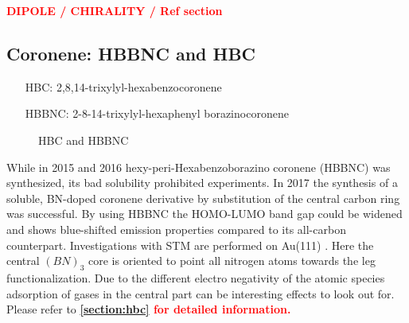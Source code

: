 \textcolor{red}{\textbf{DIPOLE / CHIRALITY / Ref section}}
\subsection{Coronene: HBBNC and HBC}
\label{sec:hbc}
\begin{itemize}
	\item[HBC:] 2,8,14-trixylyl-hexabenzocoronene	
	\item[HBBNC:] 2-8-14-trixylyl-hexaphenyl borazinocoronene
\end{itemize}

\begin{figure}[h!]\centering
{} \quad
{}
	\caption{ HBC and  HBBNC}
	\label{fig:HBBNC+HBC}
\end{figure}

While in 2015\cite{Krieg_construction_2015} and 2016 \cite{Ciccullo_Quasi-Free-Standing_2016} hexy-peri-Hexabenzoborazino coronene (HBBNC) was synthesized, its bad solubility prohibited experiments. In 2017 the synthesis \cite{dosso_synthesis_2017} of a soluble, BN-doped coronene derivative by substitution of the central carbon ring was successful. By using HBBNC the HOMO-LUMO band gap could be widened and shows blue-shifted emission properties\cite{dosso_synthesis_2017} compared to its all-carbon counterpart. Investigations with STM are performed on Au(111) \cite{Krieg_construction_2015}.
Here the central $(BN)_3$ core is oriented to point all nitrogen atoms towards the leg functionalization.
Due to the different electro negativity of the atomic species adsorption of gases in the central part can be interesting effects to look out for. Please refer to \textcolor{red}{\textbf{\autoref{section:hbc} for detailed information.}}


